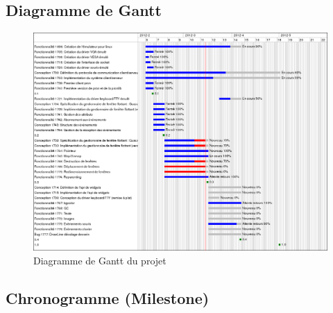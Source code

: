 \subsection{Diagramme de Gantt}

\begin{figure}[H]
  \centering
    \includegraphics{tacos-gui-gantt}
  \caption{Diagramme de Gantt du projet}
  \label{fig:diagGant}
\end{figure}


\subsection{Chronogramme (Milestone)}

